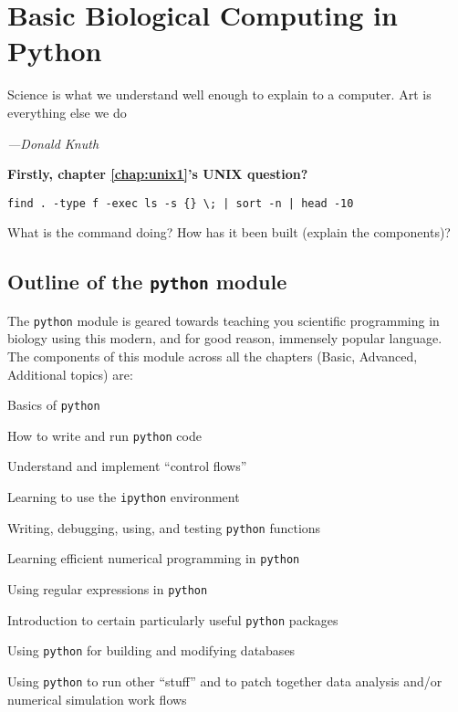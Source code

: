 \chapter{Basic Biological Computing in Python}
\label{chap:pythonI}

\epigraph{Science is what we understand well enough to explain to a 
computer. Art is everything else we do}{\textit{---Donald Knuth}}

{\bf Firstly, chapter \ref{chap:unix1}'s UNIX question?}
\begin{lstlisting}
find . -type f -exec ls -s {} \; | sort -n | head -10
\end{lstlisting}
What is the command doing? How has it been built (explain the components)?


\section{Outline of the {\tt python} module} 

The {\tt python} module is geared towards teaching you scientific 
programming in biology using this modern, and for good reason, 
immensely popular language. The components of this module across all 
the chapters (Basic, Advanced, Additional topics) are: 
\begin{compactitem}
	\item Basics of {\tt python}
	\item How to write and run {\tt python} code
	\item Understand and implement ``control flows''
	\item Learning to use the {\tt ipython} environment
	\item Writing, debugging, using, and testing {\tt python} functions
	\item Learning efficient numerical programming in {\tt python}
	\item Using regular expressions in {\tt python}  
	\item Introduction to certain particularly useful {\tt python} packages
	\item Using {\tt python} for building and modifying databases
	\item Using {\tt python} to run other ``stuff'' and to patch 
	together data analysis and/or numerical simulation work flows
\end{compactitem} 

